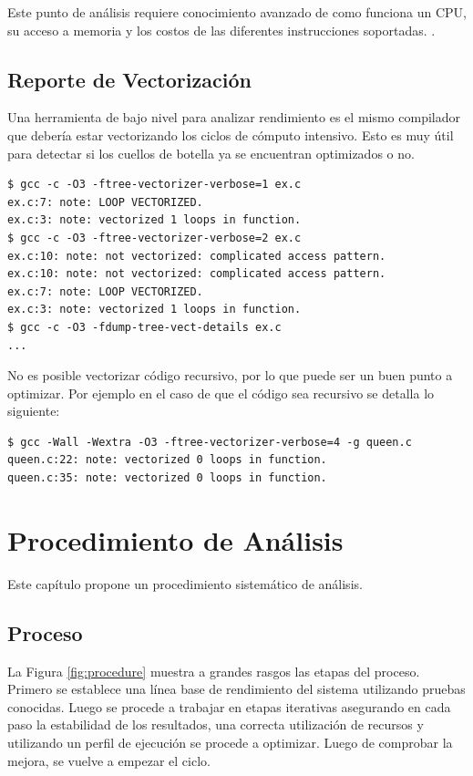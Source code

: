 \documentclass[a4paper]{report}
\begin{document}
Este punto de análisis requiere conocimiento avanzado de como funciona un CPU, su acceso a memoria y los costos de las diferentes instrucciones soportadas. \cite{hennessy} \cite{intel-optimization}.

\section{Reporte de Vectorización}

Una herramienta de bajo nivel para analizar rendimiento es el mismo compilador
que debería estar vectorizando los ciclos de cómputo intensivo. Esto es muy
útil para detectar si los cuellos de botella ya se encuentran optimizados o no.

\begin{lstlisting}
$ gcc -c -O3 -ftree-vectorizer-verbose=1 ex.c
ex.c:7: note: LOOP VECTORIZED.
ex.c:3: note: vectorized 1 loops in function.
$ gcc -c -O3 -ftree-vectorizer-verbose=2 ex.c
ex.c:10: note: not vectorized: complicated access pattern.
ex.c:10: note: not vectorized: complicated access pattern.
ex.c:7: note: LOOP VECTORIZED.
ex.c:3: note: vectorized 1 loops in function.
$ gcc -c -O3 -fdump-tree-vect-details ex.c
...
\end{lstlisting}

No es posible vectorizar código recursivo, por lo que puede ser un buen punto a
optimizar. Por ejemplo en el caso de que el código sea recursivo se detalla lo siguiente:

\begin{lstlisting}
$ gcc -Wall -Wextra -O3 -ftree-vectorizer-verbose=4 -g queen.c
queen.c:22: note: vectorized 0 loops in function.
queen.c:35: note: vectorized 0 loops in function.
\end{lstlisting}

\chapter{Procedimiento de Análisis}\label{chapter:procedure}

Este capítulo propone un procedimiento sistemático de análisis.

\section{Proceso}

La Figura \ref{fig:procedure} muestra a grandes rasgos las etapas del proceso.
Primero se establece una línea base de rendimiento del sistema utilizando pruebas conocidas.
Luego se procede a trabajar en etapas iterativas asegurando en cada paso la estabilidad de los resultados, una correcta utilización de recursos y
utilizando un perfil de ejecución se procede a optimizar. Luego de comprobar la mejora, se vuelve a empezar el ciclo.
\end{document}
